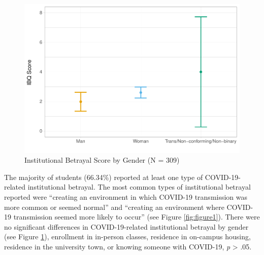 \documentclass[
  english,
  man, noextraspace]{apa6}
\begin{document}
\begin{figure}[H]

{\centering \includegraphics[width=\textwidth]{papaja_doc_files/figure-latex/figure2-1} 

}

\caption{Institutional Betrayal Score by Gender (N = 309) 
}\label{fig:figure2}
\end{figure}

The majority of students (66.34\%) reported at least one type of COVID-19-related institutional betrayal. The most common types of institutional betrayal reported were \enquote{creating an environment in which COVID-19 transmission was more common or seemed normal} and \enquote{creating an environment where COVID-19 transmission seemed more likely to occur} (see Figure \ref{fig:figure1}). There were no significant differences in COVID-19-related institutional betrayal by gender (see Figure \ref{fig:figure2}), enrollment in in-person classes, residence in on-campus housing, residence in the university town, or knowing someone with COVID-19, \emph{p} \textgreater{} .05.
\end{document}
